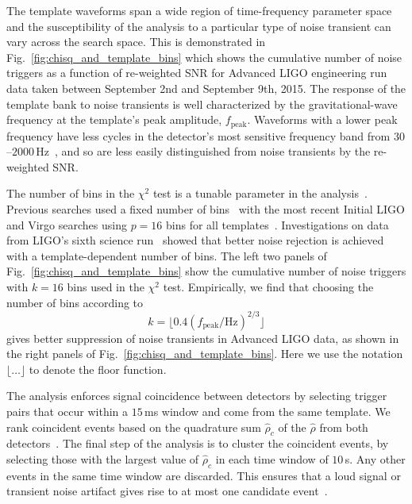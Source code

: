 The template waveforms span a wide region of time-frequency parameter space
and the susceptibility of the analysis to a particular type of noise transient
can vary across the search space. This is demonstrated in
Fig.~\ref{fig:chisq_and_template_bins} which shows the cumulative number of
noise triggers as a function of re-weighted SNR for Advanced LIGO engineering
run data taken between September 2nd and September 9th, 2015. The response of the
template bank to noise transients is well characterized by the
gravitational-wave frequency at the template's peak amplitude,
$f_\mathrm{peak}$. Waveforms with a lower peak frequency have less cycles in
the detector's most sensitive frequency band from
$30$--$2000$\,Hz~\cite{GW150914-DETECTORS,InstrumentNoisePaper}, and so are
less easily distinguished from noise transients by the re-weighted SNR. 

The number of bins in the $\chi^2$ test is a tunable parameter in the
analysis~\cite{Usman:2015kfa}. Previous searches used a fixed number of
bins~\cite{Babak:2005kv} with the most recent Initial LIGO and Virgo searches
using $p=16$ bins for all templates~\cite{Colaboration:2011np,Aasi:2012rja}.
Investigations on data from LIGO's sixth science
run~\cite{AlexNitzThesis,Aasi:2012rja} showed that better noise rejection is
achieved with a template-dependent number of bins.  The left two panels of
Fig.~\ref{fig:chisq_and_template_bins} show the cumulative number of noise
triggers with $k = 16$ bins used in the $\chi^2$ test.  Empirically, we find
that choosing the number of bins according to
\begin{equation}
k =\lfloor 0.4 (f_\mathrm{peak}/\mathrm{Hz})^{2/3}\rfloor
\label{eq:chisq_bins}
\end{equation}
gives better suppression of noise transients in Advanced LIGO data, as shown
in the right panels of Fig.~\ref{fig:chisq_and_template_bins}. Here we use
the notation $\lfloor \ldots \rfloor$ to denote the floor function.

The \pycbc{} analysis enforces signal coincidence between detectors by
selecting trigger pairs that occur within a $15\,$ms window and come from the
same template.   We rank coincident events based on the quadrature sum
$\hat{\rho}_c$ of the $\hat{\rho}$ from both detectors~\cite{Usman:2015kfa}.
The final step of the analysis is to cluster the coincident events, by
selecting those with the largest value of $\hat{\rho}_c$ in each time window
of $10$\,s. Any other events in the same time window are discarded.  This
ensures that a loud signal or transient noise artifact gives rise to at most
one candidate event~\cite{Usman:2015kfa}. 

